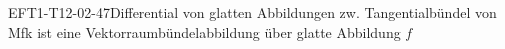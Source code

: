 
\begin{EXA}{EFT1-T12-02-47}{Differential von glatten Abbildungen zw. Tangentialbündel von Mfk ist eine Vektorraumbündelabbildung über glatte Abbildung $f$}
\end{EXA}
